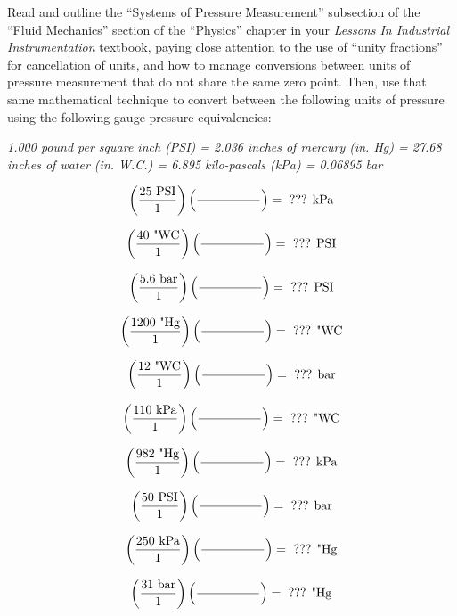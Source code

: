 

Read and outline the ``Systems of Pressure Measurement'' subsection of the ``Fluid Mechanics'' section of the ``Physics'' chapter in your {\it Lessons In Industrial Instrumentation} textbook, paying close attention to the use of ``unity fractions'' for cancellation of units, and how to manage conversions between units of pressure measurement that do not share the same zero point.  Then, use that same mathematical technique to convert between the following units of pressure using the following gauge pressure equivalencies:

\vskip 10pt

\noindent
{\it 1.000 pound per square inch (PSI) = 2.036 inches of mercury (in. Hg) = 27.68 inches of water (in. W.C.) = 6.895 kilo-pascals (kPa) = 0.06895 bar}

$$\left(25 \hbox{ PSI} \over 1 \right) \left(\hbox{\hskip 50pt} \over \hbox{\hskip 50pt}\right) = \hbox{ ??? kPa} $$

$$\left(40 \hbox{ "WC} \over 1 \right) \left(\hbox{\hskip 50pt} \over \hbox{\hskip 50pt}\right) = \hbox{ ??? PSI} $$

$$\left(5.6 \hbox{ bar} \over 1 \right) \left(\hbox{\hskip 50pt} \over \hbox{\hskip 50pt}\right) = \hbox{ ??? PSI} $$

$$\left(1200 \hbox{ "Hg} \over 1 \right) \left(\hbox{\hskip 50pt} \over \hbox{\hskip 50pt}\right) = \hbox{ ??? "WC} $$

$$\left(12 \hbox{ "WC} \over 1 \right) \left(\hbox{\hskip 50pt} \over \hbox{\hskip 50pt}\right) = \hbox{ ??? bar} $$

$$\left(110 \hbox{ kPa} \over 1 \right) \left(\hbox{\hskip 50pt} \over \hbox{\hskip 50pt}\right) = \hbox{ ??? "WC} $$

$$\left(982 \hbox{ "Hg} \over 1 \right) \left(\hbox{\hskip 50pt} \over \hbox{\hskip 50pt}\right) = \hbox{ ??? kPa} $$

$$\left(50 \hbox{ PSI} \over 1 \right) \left(\hbox{\hskip 50pt} \over \hbox{\hskip 50pt}\right) = \hbox{ ??? bar} $$

$$\left(250 \hbox{ kPa} \over 1 \right) \left(\hbox{\hskip 50pt} \over \hbox{\hskip 50pt}\right) = \hbox{ ??? "Hg} $$

$$\left(31 \hbox{ bar} \over 1 \right) \left(\hbox{\hskip 50pt} \over \hbox{\hskip 50pt}\right) = \hbox{ ??? "Hg} $$

